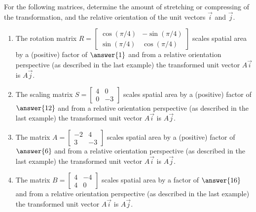 \documentclass{ximera}
\begin{document}
\begin{example}
    For the following matrices, determine the amount of stretching or compressing of the transformation, and the relative orientation of the unit vectors $\vec{i}$ and $\vec{j}$. 

    \begin{enumerate}
        \item The rotation matrix $R=\begin{bmatrix}
            \cos(\pi/4)& -\sin(\pi/4)\\ \sin(\pi/4) & \cos(\pi/4)
        \end{bmatrix}$ scales spatial area by a (positive) factor of $\answer{1}$ and from a relative orientation perspective (as described in the last example) the transformed unit vector $A\vec{i}$ is  $A\vec{j}$.
        \item The scaling matrix $S=\begin{bmatrix}
            4& 0\\ 0 & -3
        \end{bmatrix}$ scales spatial area by a (positive) factor of $\answer{12}$ and from a relative orientation perspective (as described in the last example) the transformed unit vector $A\vec{i}$ is  $A\vec{j}$.
        \item The matrix $A=\begin{bmatrix}
            -2& 4\\ 3 & -3
        \end{bmatrix}$ scales spatial area by a (positive) factor of $\answer{6}$ and from a relative orientation perspective (as described in the last example) the transformed unit vector $A\vec{i}$ is  $A\vec{j}$.
        \item The matrix $B=\begin{bmatrix}
            4& -4\\ 4 & 0
        \end{bmatrix}$ scales spatial area by a factor of $\answer{16}$ and from a relative orientation perspective (as described in the last example) the transformed unit vector $A\vec{i}$ is  $A\vec{j}$.
    \end{enumerate}
\end{example}
\end{document}
